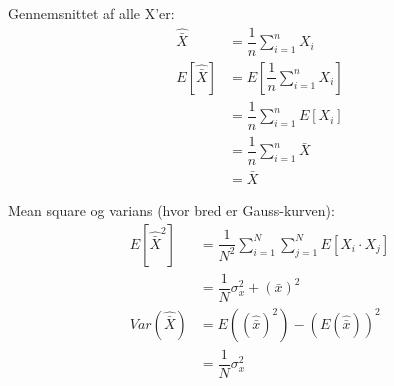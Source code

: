 \documentclass[Main]{subfiles}
\begin{document}
Gennemsnittet af alle X'er:
\begin{align*}
\hat{\bar{X}} &= \dfrac{1}{n} \sum_{i=1}^n X_i \\
E[\hat{\bar{X}}] &= E[\dfrac{1}{n} \sum_{i=1}^n X_i] \\
	&= \dfrac{1}{n} \sum_{i=1}^n E[X_i] \\
	&= \dfrac{1}{n} \sum_{i=1}^n \bar{X} \\
	&= \bar{X}
\end{align*}

Mean square og varians (hvor bred er Gauss-kurven):
\begin{align*}
E[\hat{\bar{X}}^2] &= \dfrac{1}{N^2} \sum_{i=1}^N \sum_{j=1}^N E[X_i \cdot X_j] \\
	&= \dfrac{1}{N} \sigma_x^2+(\bar{x})^2 \\
Var(\hat{\bar{X}}) &= E(( \hat{\bar{x}})^2) - ( E(\hat{\bar{x}}))^2 \\
	&= \dfrac{1}{N} \sigma_x^2
\end{align*}

\end{document}
